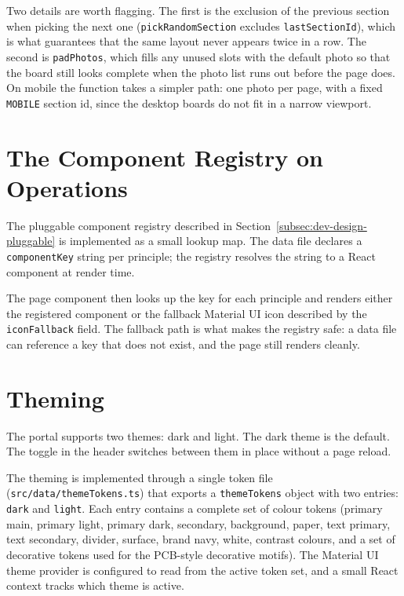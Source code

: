 Two details are worth flagging. The first is the exclusion of the previous section when picking the next one (\texttt{pickRandomSection} excludes \texttt{lastSectionId}), which is what guarantees that the same layout never appears twice in a row. The second is \texttt{padPhotos}, which fills any unused slots with the default photo so that the board still looks complete when the photo list runs out before the page does. On mobile the function takes a simpler path: one photo per page, with a fixed \texttt{MOBILE} section id, since the desktop boards do not fit in a narrow viewport.

\section{The Component Registry on Operations}\label{sec:dev-registry}

The pluggable component registry described in Section~\ref{subsec:dev-design-pluggable} is implemented as a small lookup map. The data file declares a \texttt{componentKey} string per principle; the registry resolves the string to a React component at render time.

The page component then looks up the key for each principle and renders either the registered component or the fallback Material UI icon described by the \texttt{iconFallback} field. The fallback path is what makes the registry safe: a data file can reference a key that does not exist, and the page still renders cleanly.

\section{Theming}\label{sec:dev-theming}

The portal supports two themes: dark and light. The dark theme is the default. The toggle in the header switches between them in place without a page reload.

The theming is implemented through a single token file (\texttt{src/data/themeTokens.ts}) that exports a \texttt{themeTokens} object with two entries: \texttt{dark} and \texttt{light}. Each entry contains a complete set of colour tokens (primary main, primary light, primary dark, secondary, background, paper, text primary, text secondary, divider, surface, brand navy, white, contrast colours, and a set of decorative tokens used for the PCB-style decorative motifs). The Material UI theme provider is configured to read from the active token set, and a small React context tracks which theme is active.


